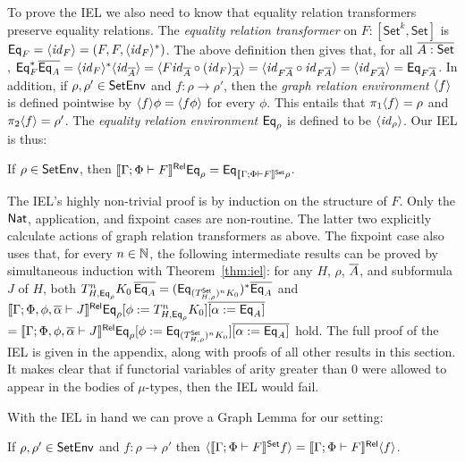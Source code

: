 \documentclass[runningheads]{llncs}
\newcommand{\set}{\mathsf{Set}}
\renewcommand{\id}{\mathit{id}}
\renewcommand{\id}{\mathit{id}}
\begin{document}
To prove the IEL we also need to know that equality relation
transformers preserve equality relations. The {\em equality relation
  transformer} on $F : [\set^k,\set]$ is $\Eq_F = \graph{\id_{F}} =
(F, F, \graph{\id_{F}}^*)$.
The above definition then gives that, for all $\ol{A : \set}$,
$\Eq^*_F \ol{\Eq_A}
= \graph{\id_F}^* \graph{\id_{\ol{A}}}
= \graph{F \id_{\ol{A}} \circ (\id_F)_{\ol{A}}}
= \graph{\id_{F\ol{A}} \circ \id_{F\ol{A}}}
= \graph{\id_{F\ol{A}}}
= \Eq_{F\ol{A}}$. In addition,
if $\rho, \rho' \in \mathsf{SetEnv}$ and $f : \rho \to \rho'$, then
the {\em graph relation environment} $\langle {f} \rangle$ is defined pointwise
by $\langle {f} \rangle \phi = \langle {f \phi} \rangle$ for every $\phi$. This entails
that $\pi_1 \langle {f} \rangle = \rho$ and $\pi_2 \langle {f} \rangle = \rho'$.  The {\em
  equality relation environment} $\mathsf{Eq}_\rho$ is defined to be
$\graph{\id_{\rho}}$. Our IEL is thus:
\begin{theorem}[IEL]\label{thm:iel}
    If $\rho \in \mathsf{SetEnv}$, then
  $\relsem{\Gamma; \Phi \vdash F} \Eq_\rho = \Eq_{\setsem{\Gamma;
      \Phi \vdash F}\rho}$.
\end{theorem}
The IEL's highly non-trivial proof is by induction on the
structure of $F$. Only the $\mathsf{Nat}$, application, and fixpoint cases are
non-routine. The latter two explicitly calculate
actions of graph relation transformers as above.  The fixpoint case
also uses that, for every $n \in \mathbb{N}$, the following intermediate
results can be proved by simultaneous induction with
Theorem~\ref{thm:iel}: for any $H$, $\rho$, $\overline{A}$, and subformula
$J$ of $H$, both
$T^n_{H,\Eq_{\rho}} K_0\, \ol{\Eq_A}
= (\Eq_{(T^\set_{H,\rho})^n K_0})^*
\ol{\Eq_A}$\;
and 
$ \llbracket{\Gamma; \Phi, \phi, \overline{\alpha} \vdash J}\rrbracket^{\mathsf{Rel}} \mathsf{Eq}_{\rho} [\phi
  := T^{n}_{H,\mathsf{Eq}_{\rho}} K_0] \overline{[\alpha := \mathsf{Eq}_A]}$ $=
\relsem{\Gamma; \Phi, \phi, \ol{\alpha} \vdash J} \Eq_{\rho}[\phi :=
\Eq_{(T^\set_{H,\rho})^n K_0}] \overline{[\alpha := \Eq_A]}$
hold. The full proof of the IEL is given in the appendix,
  along with proofs of all other results in this section. It makes
clear that if functorial variables of arity greater than $0$ were
allowed to appear in the bodies of $\mu$-types, then the IEL would
fail.

With the IEL in hand we can prove a Graph Lemma for our setting:

\vspace*{-0.05in}

\begin{lemma}%
  \label{lem:graph}
  If $\rho, \rho' \in \mathsf{SetEnv}$ and $f : \rho \to \rho'$
  then $\graph{\setsem{\Gamma; \Phi \vdash F} f} =
\relsem{\Gamma; \Phi \vdash F}\graph{f}$.
\end{lemma}
\end{document}
